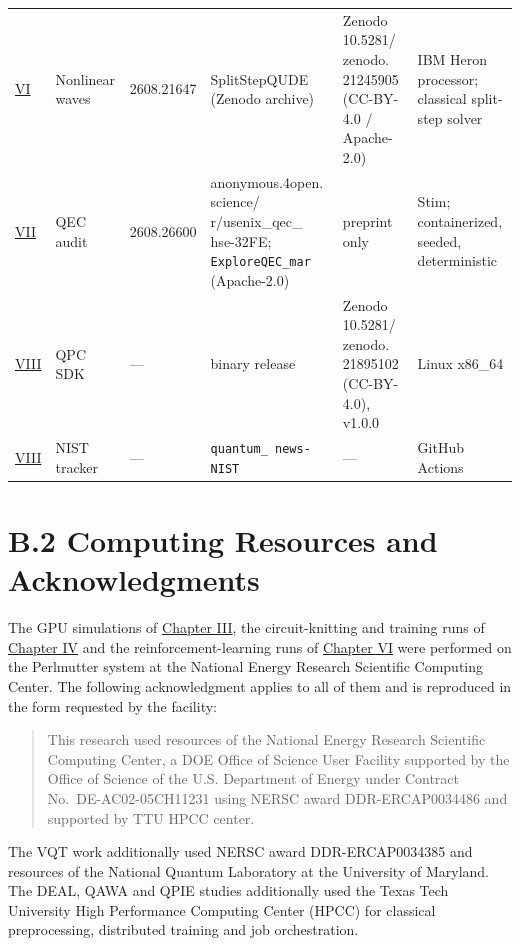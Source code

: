 \documentclass{report}
\theoremstyle{plain}
\theoremstyle{definition}
\theoremstyle{remark}
\begin{document}
\begin{table}
\begin{tabular}{llllll}
\hyperref[ch:synthesis]{VI} & Nonlinear waves~\cite{guo2026nonlinearwaves} & 2608.21647 & SplitStepQUDE (Zenodo archive) & Zenodo 10.5281/  zenodo.  21245905 (CC-BY-4.0 / Apache-2.0)~\cite{guo2026splitstepqude} & IBM Heron processor; classical split-step solver \\
\hyperref[ch:qec]{VII} & QEC audit~\cite{guo2026qecaudit} & 2608.26600 & anonymous.4open.  science/  r/usenix\_qec\_  hse-32FE; \texttt{ExploreQEC\_mar} (Apache-2.0) & preprint only & Stim; containerized, seeded, deterministic \\
\hyperref[ch:pqc]{VIII} & QPC SDK~\cite{guo2026lightriderqpc} & --- & binary release & Zenodo 10.5281/  zenodo.  21895102 (CC-BY-4.0), v1.0.0 & Linux x86\_64 \\
\hyperref[ch:pqc]{VIII} & NIST tracker~\cite{guo2026nisttracker} & --- & \texttt{quantum\_  news-NIST} & --- & GitHub Actions \\
\bottomrule
\end{tabular}
\end{table}

 

\section{B.2 Computing Resources and Acknowledgments}\label{sec:apprepro:hpc}

The GPU simulations of \hyperref[ch:qgear]{Chapter III}, the circuit-knitting and training runs of \hyperref[ch:qml]{Chapter IV} and the reinforcement-learning runs of \hyperref[ch:synthesis]{Chapter VI} were performed on the Perlmutter system at the National Energy Research Scientific Computing Center. The following acknowledgment applies to all of them and is reproduced in the form requested by the facility:

\begin{quote}
This research used resources of the National Energy Research Scientific Computing Center, a DOE Office of Science User Facility supported by the Office of Science of the U.S. Department of Energy under Contract No.\ DE-AC02-05CH11231 using NERSC award DDR-ERCAP0034486 and supported by TTU HPCC center.
\end{quote}

The VQT work additionally used NERSC award DDR-ERCAP0034385 and resources of the National Quantum Laboratory at the University of Maryland. The DEAL, QAWA and QPIE studies additionally used the Texas Tech University High Performance Computing Center (HPCC) for classical preprocessing, distributed training and job orchestration.
\end{document}
